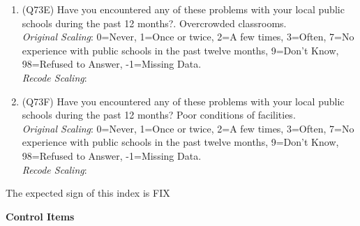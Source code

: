 \documentclass[]{article}
\begin{document}
\begin{enumerate}
\begin{enumerate}
    \item (Q73E) Have you encountered any of these problems with your local public schools during the past 12 months?. Overcrowded classrooms.\\ \textit{Original Scaling}: 0=Never, 1=Once or twice, 2=A few times, 3=Often, 7=No experience with public schools in the past twelve months, 9=Don’t Know, 98=Refused to Answer, -1=Missing Data. \\ \textit{Recode Scaling}:  
    \item (Q73F) Have you encountered any of these problems with your local public schools during the past 12 months? Poor conditions of facilities.\\ \textit{Original Scaling}: 0=Never, 1=Once or twice, 2=A few times, 3=Often, 7=No experience with public schools in the past twelve months, 9=Don’t Know, 98=Refused to Answer, -1=Missing Data. \\ \textit{Recode Scaling}:   
  \end{enumerate}
  The expected sign of this index is FIX
\end{enumerate}

\textbf{Control Items}
\end{document}
